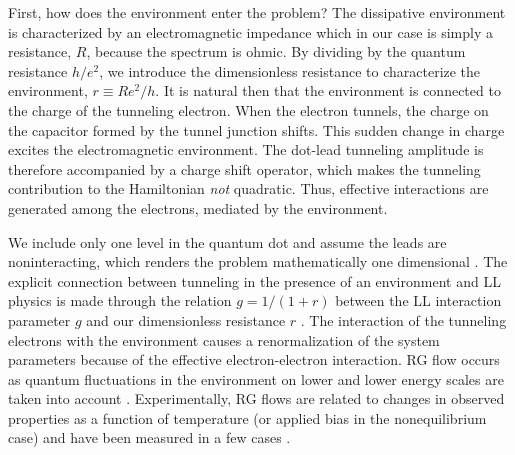 \documentclass[aps,prb,reprint,floatfix,superscriptaddress,amssymb,amsmath]{revtex4-2}
\begin{document}
First, how does the environment enter the problem? The dissipative environment is characterized by an electromagnetic impedance which in our case is simply a resistance, $R$, because the spectrum is ohmic. By dividing by the quantum resistance $h/e^2$, we introduce the dimensionless resistance to characterize the environment, $r\equiv Re^2/h$. It is natural then that the environment is connected to the charge of the tunneling electron. When the electron tunnels, the charge on the capacitor formed by the tunnel junction shifts. This sudden change in charge excites the electromagnetic environment. The dot-lead tunneling amplitude is therefore accompanied by a charge shift operator, which makes the tunneling contribution to the Hamiltonian \emph{not} quadratic. Thus, effective interactions are generated among the electrons, mediated by the environment. 

We include only one level in the quantum dot and assume the leads are noninteracting, which renders the problem mathematically one dimensional \cite{HewsonBook,GogolinBook}. The explicit connection between tunneling in the presence of an environment and LL physics is made through the relation $g\!=\!1/(1+r)$ between the LL interaction parameter $g$ and our dimensionless resistance $r$ \cite{SafiSaleurPRL04, FlorensPRB07, Mebrahtu12, LiuRLdissipPRB14, Zheng1-GPRB14}. 
The interaction of the tunneling electrons with the environment causes a renormalization of the system parameters because of the effective electron-electron interaction. 
RG flow occurs as quantum fluctuations in the environment on lower and lower energy scales are taken into account \cite{FisherRGRMP98}. Experimentally, RG flows are related to changes in observed properties as a function of temperature (or applied bias in the nonequilibrium case) and have been measured in a few cases \cite{WeiTsuiPRB86, MurzinFQHEflowPRB05, IftikharPierreNat15,IftikharPierreScience18}. 
\end{document}
